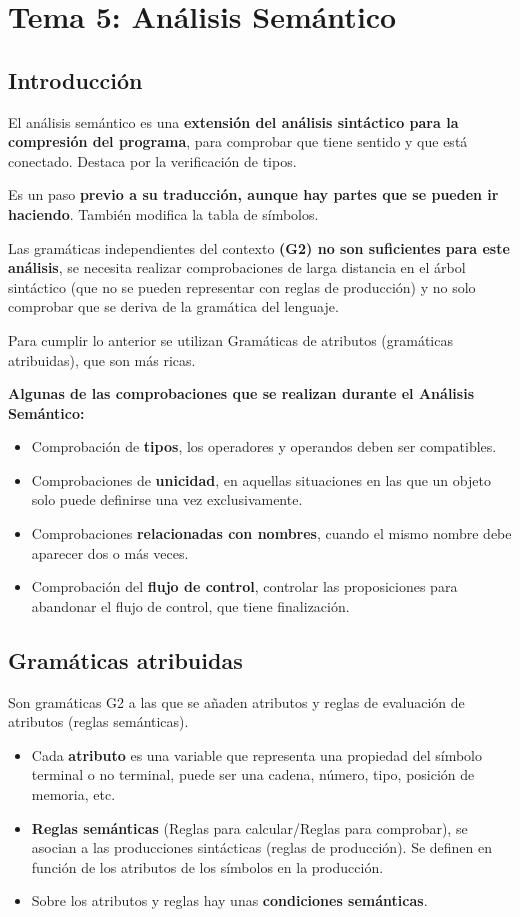 \documentclass[12pt, twoside, openright]{report} %
\begin{document}
\chapter{Tema 5: Análisis Semántico}

\section{Introducción}
El análisis semántico es una \textbf{extensión del análisis sintáctico para la compresión del programa}, para comprobar que tiene sentido y que está conectado. Destaca por la verificación de tipos.

Es un paso \textbf{previo a su traducción, aunque hay partes que se pueden ir haciendo}. También modifica la tabla de símbolos.

Las gramáticas independientes del contexto \textbf{(G2) no son suficientes para este análisis}, se necesita realizar comprobaciones de larga distancia en el árbol sintáctico (que no se pueden representar con reglas de producción) y no solo comprobar que se deriva de la gramática del lenguaje.

Para cumplir lo anterior se utilizan Gramáticas de atributos (gramáticas atribuidas), que son más ricas.

\textbf{Algunas de las comprobaciones que se realizan durante el Análisis Semántico:}
\begin{itemize}
  \item Comprobación de \textbf{tipos}, los operadores y operandos deben ser compatibles.
  \item Comprobaciones de \textbf{unicidad}, en aquellas situaciones en las que un objeto solo puede definirse una vez exclusivamente.
  \item Comprobaciones \textbf{relacionadas con nombres}, cuando el mismo nombre debe aparecer dos o más veces.
  \item Comprobación del \textbf{flujo de control}, controlar las proposiciones para abandonar el flujo de control, que tiene finalización.
\end{itemize}
\pagebreak
\section{Gramáticas atribuidas}
Son gramáticas G2 a las que se añaden atributos y reglas de evaluación de atributos (reglas semánticas).
\begin{itemize}
  \item Cada \textbf{atributo} es una variable que representa una propiedad del símbolo terminal o no terminal, puede ser una cadena, número, tipo, posición de memoria, etc.
  \item \textbf{Reglas semánticas} (Reglas para calcular/Reglas para comprobar), se asocian a las producciones sintácticas (reglas de producción). Se definen en función de los atributos de los símbolos en la producción.
  \item Sobre los atributos y reglas hay unas \textbf{condiciones semánticas}.
\end{itemize}
\end{document}
